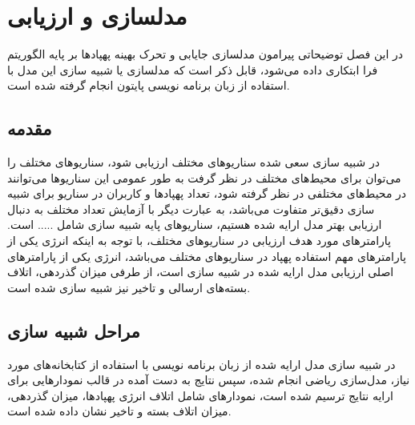 \chapter{مدلسازی و ارزیابی}\label{Chapter4}
در این فصل توضیحاتی پیرامون مدلسازی جایابی و تحرک بهینه پهپاد‌ها بر پایه الگوریتم فرا ابتکاری  داده می‌شود، قابل ذکر است که مدلسازی یا شبیه سازی این مدل با استفاده از زبان برنامه نویسی پایتون انجام گرفته شده است. 
\section{مقدمه}
در شبیه سازی سعی شده سناریو‌های مختلف ارزیابی شود، سناریو‌های مختلف را می‌توان برای محیط‌های مختلف در نظر گرفت به طور عمومی این سناریو‌ها می‌توانند در محیط‌‌های مختلفی در نظر گرفته شود، تعداد پهپادها و کاربران در سناریو برای شبیه سازی دقیق‌تر متفاوت می‌باشد، به عبارت دیگر با آزمایش تعداد مختلف به دنبال ارزیابی بهتر مدل ارایه شده هستیم، سناریوهای پایه شبیه سازی شامل ..... است. 
پارامتر‌‌های مورد هدف ارزیابی در سناریو‌های مختلف، با توجه به اینکه انرژی یکی از پارامترهای مهم استفاده پهپاد در سناریو‌های مختلف می‌باشد، انرژی یکی از پارامتر‌های اصلی ارزیابی مدل ارایه شده در شبیه سازی است، از طرفی میزان گذردهی، اتلاف بسته‌های ارسالی و تاخیر نیز شبیه سازی شده است.

\section{مراحل شبیه سازی}
در شبیه سازی مدل ارایه شده از زبان برنامه نویسی  با استفاده از کتابخانه‌های مورد نیاز، مدل‌سازی ریاضی انجام شده، سپس نتایج به دست آمده در قالب نمودار‌‌هایی برای ارایه نتایج ترسیم شده است، نمودار‌های شامل اتلاف انرژی پهپادها، میزان گذردهی، میزان اتلاف بسته و تاخیر نشان داده شده است.

